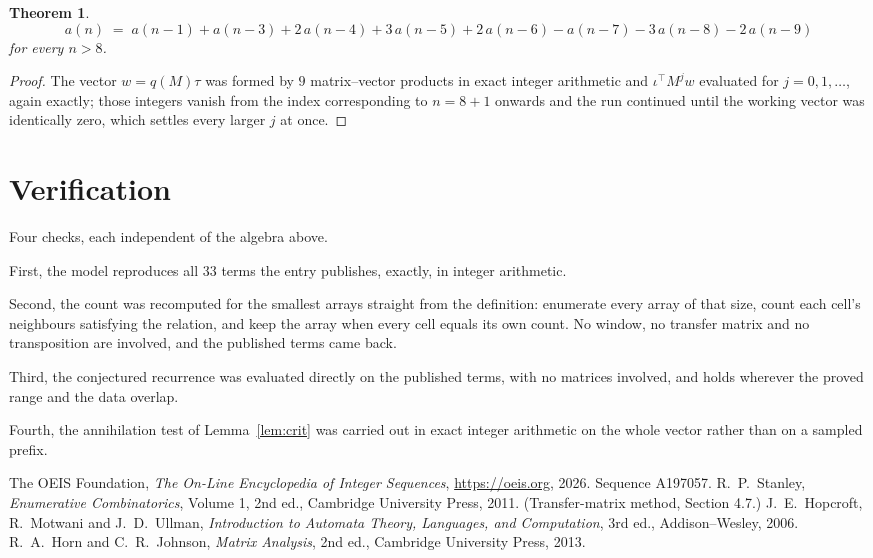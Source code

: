 \documentclass[11pt,a4paper]{article}
\theoremstyle{plain}
\newtheorem{theorem}{Theorem}
\theoremstyle{definition}
\begin{document}
\begin{theorem}
\[
a(n)\;=\;a(n-1) + a(n-3) + 2\,a(n-4) + 3\,a(n-5) + 2\,a(n-6) - a(n-7) - 3\,a(n-8) - 2\,a(n-9)
\]
for every $n>8$.
\end{theorem}

\begin{proof}
The vector $w=q(M)\tau$ was formed by $9$ matrix--vector products in exact integer
arithmetic and $\iota^{\!\top}M^{j}w$ evaluated for $j=0,1,\dots$, again exactly; those
integers vanish from the index corresponding to $n=8+1$ onwards and the run continued
until the working vector was identically zero, which settles every larger $j$ at once.
\end{proof}

\section{Verification}

Four checks, each independent of the algebra above.

First, the model reproduces all $33$ terms the entry publishes, exactly, in integer
arithmetic.

Second, the count was recomputed for the smallest arrays straight from the definition:
enumerate every array of that size, count each cell's neighbours satisfying the relation, and
keep the array when every cell equals its own count. No window, no transfer matrix and no
transposition are involved, and the published terms came back.

Third, the conjectured recurrence was evaluated directly on the published terms, with no
matrices involved, and holds wherever the proved range and the data overlap.

Fourth, the annihilation test of Lemma~\ref{lem:crit} was carried out in exact integer
arithmetic on the whole vector rather than on a sampled prefix.

\begin{thebibliography}{9}
 The OEIS Foundation, \emph{The On-Line Encyclopedia of Integer
Sequences}, \url{https://oeis.org}, 2026. Sequence A197057.
 R.~P.~Stanley, \emph{Enumerative Combinatorics}, Volume 1, 2nd ed.,
Cambridge University Press, 2011. (Transfer-matrix method, Section 4.7.)
 J.~E.~Hopcroft, R.~Motwani and J.~D.~Ullman, \emph{Introduction to Automata
Theory, Languages, and Computation}, 3rd ed., Addison--Wesley, 2006.
 R.~A.~Horn and C.~R.~Johnson, \emph{Matrix Analysis}, 2nd ed., Cambridge
University Press, 2013.
\end{thebibliography}
\end{document}
